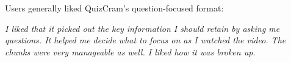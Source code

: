 \documentclass{chi-ext}
\begin{document}
Users generally liked QuizCram's question-focused format:

 \emph{I liked that it picked out the key information I should retain by asking me questions. It helped me decide what to focus on as I watched the video. The chunks were very manageable as well. I liked how it was broken up.}








\end{document}
